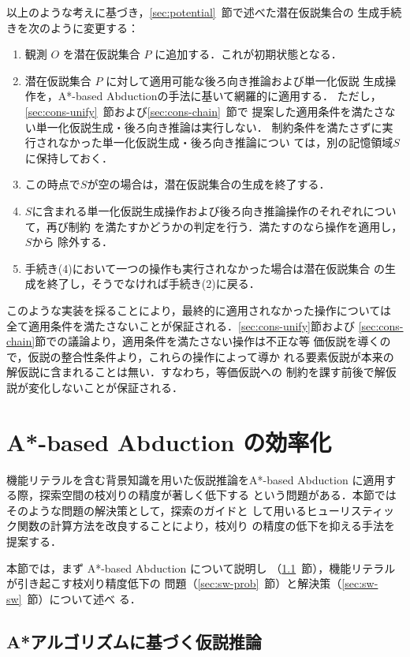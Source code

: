 \documentclass[japanese]{jnlp_1.4}
\begin{document}
以上のような考えに基づき，\ref{sec:potential}~節で述べた潜在仮説集合の
生成手続きを次のように変更する：
\begin{enumerate}
\item 観測 $O$ を潜在仮説集合 $P$ に追加する．これが初期状態となる．
\item 潜在仮説集合 $P$ に対して適用可能な後ろ向き推論および単一化仮説
	 生成操作を，A*-based Abductionの手法に基いて網羅的に適用する．
	 ただし，\ref{sec:cons-unify}~節および\ref{sec:cons-chain}~節で
	 提案した適用条件を満たさない単一化仮説生成・後ろ向き推論は実行しない．
	 制約条件を満たさずに実行されなかった単一化仮説生成・後ろ向き推論につい
	 ては，別の記憶領域$S$に保持しておく．
\item この時点で$S$が空の場合は，潜在仮説集合の生成を終了する．
\item $S$に含まれる単一化仮説生成操作および後ろ向き推論操作のそれぞれについて，再び制約
	 を満たすかどうかの判定を行う．満たすのなら操作を適用し，$S$から
	 除外する．
\item 手続き(4)において一つの操作も実行されなかった場合は潜在仮説集合
	 の生成を終了し，そうでなければ手続き(2)に戻る．
\end{enumerate}
このような実装を採ることにより，最終的に適用されなかった操作については
全て適用条件を満たさないことが保証される．\ref{sec:cons-unify}節および
\ref{sec:cons-chain}節での議論より，適用条件を満たさない操作は不正な等
価仮説を導くので，仮説の整合性条件より，これらの操作によって導か
れる要素仮説が本来の解仮説に含まれることは無い．すなわち，等価仮説への
制約を課す前後で解仮説が変化しないことが保証される．



\section{A*-based Abduction の効率化}
\label{sec:stopword}

機能リテラルを含む背景知識を用いた仮説推論をA*-based Abduction
\cite{Yamamoto15} に適用する際，探索空間の枝刈りの精度が著しく低下する
という問題がある．本節ではそのような問題の解決策として，探索のガイドと
して用いるヒューリスティック関数の計算方法を改良することにより，枝刈り
の精度の低下を抑える手法を提案する．

本節では，まず A*-based Abduction について説明し
（\ref{sec:yamamoto15}~節），機能リテラルが引き起こす枝刈り精度低下の
問題（\ref{sec:sw-prob}~節）と解決策（\ref{sec:sw-sw}~節）について述べ
る．

\subsection{A*アルゴリズムに基づく仮説推論}
\label{sec:yamamoto15}
\end{document}
